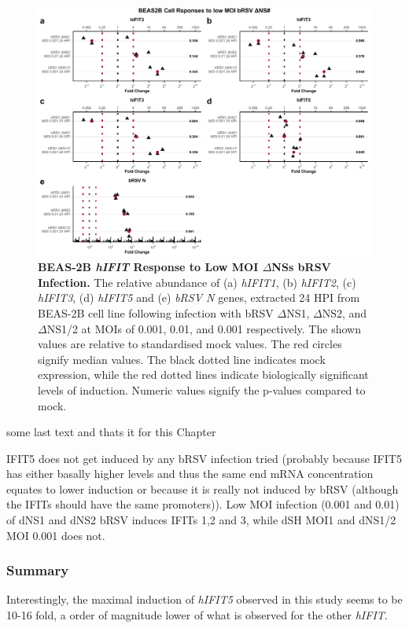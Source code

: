 \begin{figure}
    \centering
    \includegraphics[width=1\linewidth]{06. Chapter 1/Figs/01. Induction/12. beas2b_brsv_dns.pdf}
    \caption[BEAS-2B \textit{hIFIT} Response to Low MOI \(\Delta\)NSs bRSV Infection.]{\textbf{BEAS-2B \textit{hIFIT} Response to Low MOI \(\Delta\)NSs bRSV Infection.} The relative abundance of (a) \textit{hIFIT1}, (b) \textit{hIFIT2}, (c) \textit{hIFIT3}, (d) \textit{hIFIT5} and (e) \textit{bRSV N} genes, extracted 24 HPI from BEAS-2B cell line following infection with bRSV \(\Delta\)NS1, \(\Delta\)NS2, and \(\Delta\)NS1/2 at MOIs of 0.001, 0.01, and 0.001 respectively. The shown values are relative to standardised mock values. The red circles signify median values. The black dotted line indicates mock expression, while the red dotted lines indicate biologically significant levels of induction. Numeric values signify the p-values compared to mock.}
    \label{BEAS-2B responses to bRSV dNSs.}
\end{figure}


some last text and thats it for this Chapter

IFIT5 does not get induced by any bRSV infection tried (probably because IFIT5 has either basally higher levels and thus the same end mRNA concentration equates to lower induction or because it is really not induced by bRSV (although the IFITs should have the same promoters)). Low MOI infection (0.001 and 0.01) of dNS1 and dNS2 bRSV induces IFITs 1,2 and 3, while dSH MOI1 and dNS1/2 MOI 0.001 does not. 

\subsubsection*{Summary} \label{Summary-human-induction}
Interestingly, the maximal induction of \textit{hIFIT5} observed in this study seems to be 10-16 fold, a order of magnitude lower of what is observed for the other \textit{hIFIT}.